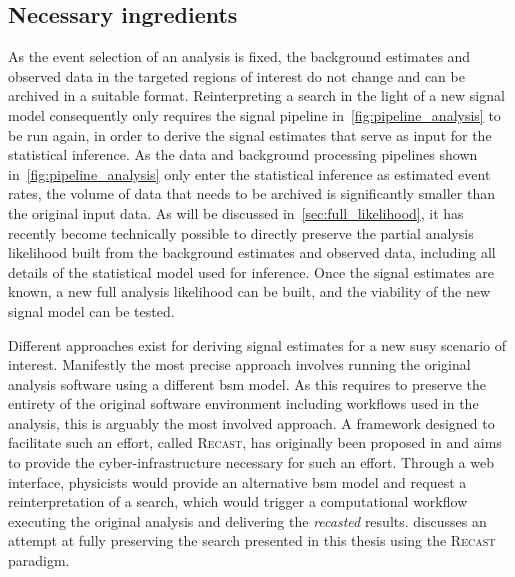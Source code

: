 \subsection{Necessary ingredients}

As the event selection of an analysis is fixed, the background estimates and observed data in the targeted regions of interest do not change and can be archived in a suitable format. Reinterpreting a search in the light of a new signal model consequently only requires the signal pipeline in~\cref{fig:pipeline_analysis} to be run again, in order to derive the signal estimates that serve as input for the statistical inference. As the data and background processing pipelines shown in~\cref{fig:pipeline_analysis} only enter the statistical inference as estimated event rates, the volume of data that needs to be archived is significantly smaller than the original input data. As will be discussed in~\cref{sec:full_likelihood}, it has recently become technically possible to directly preserve the partial analysis likelihood built from the background estimates and observed data, including all details of the statistical model used for inference. Once the signal estimates are known, a new full analysis likelihood can be built, and the viability of the new signal model can be tested. 

Different approaches exist for deriving signal estimates for a new \gls{susy} scenario of interest. Manifestly the most precise approach involves running the original analysis software using a different \gls{bsm} model. As this requires to preserve the entirety of the original software environment including workflows used in the analysis, this is arguably the most involved approach. A framework designed to facilitate such an effort, called \textsc{Recast}, has originally been proposed in \cite{RECAST_cranmer} and aims to provide the cyber-infrastructure necessary for such an effort. Through a web interface, physicists would provide an alternative \gls{bsm} model and request a reinterpretation of a search, which would trigger a computational workflow executing the original analysis and delivering the \textit{recasted} results.  discusses an attempt at fully preserving the \onelepton search presented in this thesis using the \textsc{Recast} paradigm. 

